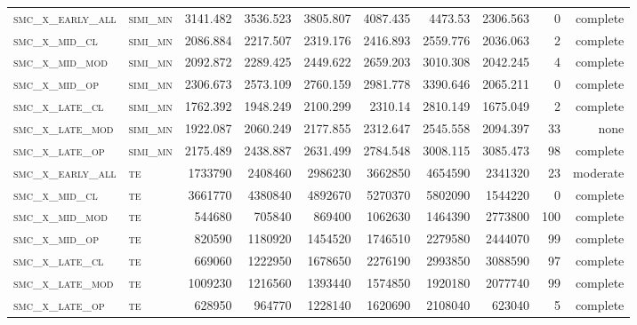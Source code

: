 \begin{landscape}
\begin{center}
\begin{footnotesize}
\begin{longtable}{llrrrrr|rrr}
\textsc{smc\_x\_early\_all} & \textsc{simi\_mn  }   & 3141.482   & 3536.523   & 3805.807   & 4087.435   & 4473.53    & 2306.563   & 0     & complete   \\
\textsc{smc\_x\_mid\_cl   } & \textsc{simi\_mn  }   & 2086.884   & 2217.507   & 2319.176   & 2416.893   & 2559.776   & 2036.063   & 2     & complete   \\
\textsc{smc\_x\_mid\_mod  } & \textsc{simi\_mn  }   & 2092.872   & 2289.425   & 2449.622   & 2659.203   & 3010.308   & 2042.245   & 4     & complete   \\
\textsc{smc\_x\_mid\_op   } & \textsc{simi\_mn  }   & 2306.673   & 2573.109   & 2760.159   & 2981.778   & 3390.646   & 2065.211   & 0     & complete   \\
\textsc{smc\_x\_late\_cl  } & \textsc{simi\_mn  }   & 1762.392   & 1948.249   & 2100.299   & 2310.14    & 2810.149   & 1675.049   & 2     & complete   \\
\textsc{smc\_x\_late\_mod } & \textsc{simi\_mn  }   & 1922.087   & 2060.249   & 2177.855   & 2312.647   & 2545.558   & 2094.397   & 33    & none   \\
\textsc{smc\_x\_late\_op  } & \textsc{simi\_mn  }   & 2175.489   & 2438.887   & 2631.499   & 2784.548   & 3008.115   & 3085.473   & 98    & complete   \\
\textsc{smc\_x\_early\_all} & \textsc{te  	    }   & 1733790    & 2408460    & 2986230    & 3662850    & 4654590    & 2341320    & 23    & moderate   \\
\textsc{smc\_x\_mid\_cl   } & \textsc{te        }   & 3661770    & 4380840    & 4892670    & 5270370    & 5802090    & 1544220    & 0     & complete   \\
\textsc{smc\_x\_mid\_mod  } & \textsc{te        }   & 544680     & 705840     & 869400     & 1062630    & 1464390    & 2773800    & 100   & complete   \\
\textsc{smc\_x\_mid\_op   } & \textsc{te        }   & 820590     & 1180920    & 1454520    & 1746510    & 2279580    & 2444070    & 99    & complete   \\
\textsc{smc\_x\_late\_cl  } & \textsc{te        }   & 669060     & 1222950    & 1678650    & 2276190    & 2993850    & 3088590    & 97    & complete   \\
\textsc{smc\_x\_late\_mod } & \textsc{te        }   & 1009230    & 1216560    & 1393440    & 1574850    & 1920180    & 2077740    & 99    & complete   \\
\textsc{smc\_x\_late\_op  } & \textsc{te        }   & 628950     & 964770     & 1228140    & 1620690    & 2108040    & 623040     & 5     & complete   

\end{longtable}
\end{footnotesize}
\end{center}
\end{landscape}

\restoregeometry
\pagestyle{headings}
